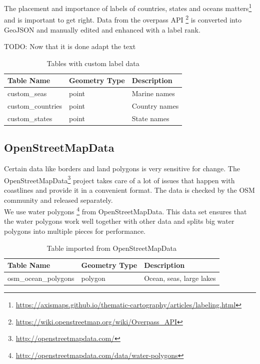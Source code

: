 The placement and importance of labels of countries, states and oceans matters\footnote{\url{https://axismaps.github.io/thematic-cartography/articles/labeling.html}} and is important to get right. Data from the overpass API \footnote{\url{https://wiki.openstreetmap.org/wiki/Overpass_API}} is converted into GeoJSON and
manually edited and enhanced with a label rank.

TODO: Now that it is done adapt the text

\begin{table}[H]
    \begin{tabular}{lll}
    \hline
    Table Name   & Geometry Type & Description \\
    \hline                                          
    custom\_seas       & point    & Marine names \\
    custom\_countries    & point    & Country names \\
    custom\_states       & point    & State names \\
    \end{tabular}
    \caption{Tables with custom label data}
\end{table}

\subsection{OpenStreetMapData}

Certain \osm{} data like borders and land polygons is very sensitive for change.
The OpenStreetMapData\footnote{\url{http://openstreetmapdata.com/}}
project takes care of a lot of issues that happen with coastlines
and provide it in a convenient format. The data is checked by the OSM community
and released separately.
\\
We use water polygons \footnote{\url{http://openstreetmapdata.com/data/water-polygons}} from OpenStreetMapData. This data set ensures that the water polygons
work well together with other \osm{} data and splits big water polygons into multiple 
pieces for performance.

\begin{table}[H]
    \begin{tabular}{lll}
    \hline
    Table Name            & Geometry Type & Description \\
    \hline
    osm\_ocean\_polygons        & polygon       & Ocean, seas, large lakes           \\
    \end{tabular}
    \caption{Table imported from OpenStreetMapData}
\end{table}

